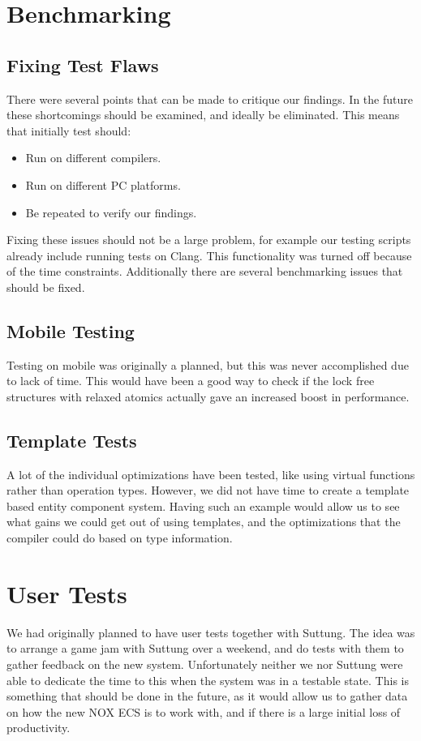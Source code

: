 \section{Benchmarking}
\subsection{Fixing Test Flaws}
There were several points that can be made to critique our findings.
In the future these shortcomings should be examined, and ideally be eliminated.
This means that initially test should:
\begin{itemize}
    \item
    Run on different compilers.
    \item
    Run on different PC platforms.
    \item
    Be repeated to verify our findings.
\end{itemize}
Fixing these issues should not be a large problem, for example our testing scripts already include
running tests on Clang. This functionality was turned off because of the time constraints.
Additionally there are several benchmarking issues that should be fixed.

\subsection{Mobile Testing}
Testing on mobile was originally a planned, but this was never accomplished due to lack of time.
This would have been a good way to check if the lock free structures with relaxed atomics actually
gave an increased boost in performance.

\subsection{Template Tests}
A lot of the individual optimizations have been tested, like using virtual functions rather than
operation types. However, we did not have time to create a template based entity component system.
Having such an example would allow us to see what gains we could get out of using templates,
and the optimizations that the compiler could do based on type information.

\section{User Tests}
We had originally planned to have user tests together with Suttung.
The idea was to arrange a game jam with Suttung over a weekend,
and do tests with them to gather feedback on the new system.
Unfortunately neither we nor Suttung were able to dedicate the time to this when the system
was in a testable state.
This is something that should be done in the future, as it would allow us to gather
data on how the new NOX ECS is to work with, and if there is a large initial loss of productivity.

